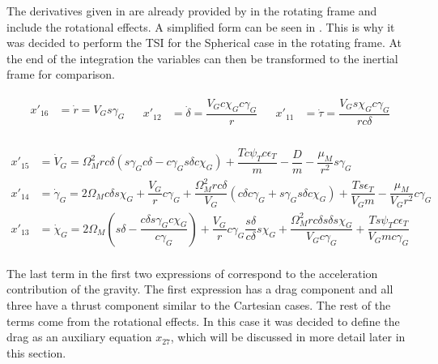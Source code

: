 \noindent
The derivatives given in  are already provided by \cite{mooij1994motion} in the rotating frame and include the rotational effects. A simplified form can be seen in . This is why it was decided to perform the \ac{TSI} for the Spherical case in the rotating frame. At the end of the integration the variables can then be transformed to the inertial frame for comparison.

\begin{align} \label{eq:kinEqSp}
\begin{split}
x'_{16} &= \dot{r} = V_{G} s \gamma_{G} \\
\end{split}
&
\begin{split}
x'_{12} &= \dot{\delta} = \dfrac{V_{G} c \chi_{G} c \gamma_{G}}{r} \\
\end{split}
&
\begin{split}
x'_{11} &= \dot{\tau} = \dfrac{V_{G} s \chi_{G} c \gamma_{G}}{r c \delta} \\
\end{split}
\end{align}


\begin{equation} \label{eq:dynEqSp}
\begin{split}
x'_{15} &= \dot{V}_{G} =  \Omega_{M}^{2} r c\delta \left(s\gamma_{G}c\delta-c\gamma_{G}s\delta c\chi_{G}\right)+\dfrac{Tc\psi_{T}c\epsilon_{T}}{m}-\dfrac{D}{m}-\dfrac{\mu_{M}}{r^{2}}s\gamma_{G} \\
x'_{14} &= \dot{\gamma}_{G} = 2\Omega_{M}c\delta s\chi_{G} + \dfrac{V_{G}}{r}c\gamma_{G}+\dfrac{\Omega_{M}^{2}r c\delta}{V_{G}}\left(c\delta c\gamma_{G}+s\gamma_{G} s\delta c\chi_{G}\right)+\dfrac{T s\epsilon_{T}}{V_{G}m}-\dfrac{\mu_{M}}{V_{G}r^{2}}c\gamma_{G} \\
x'_{13} &= \dot{\chi}_{G} = 2 \Omega_{M} \left(s\delta-\dfrac{c\delta s\gamma_{G} c\chi_{G}}{c \gamma_{G}}\right)+\dfrac{V_{G}}{r}c\gamma_{G}\dfrac{s\delta}{c \delta}s\chi_{G}+\dfrac{\Omega_{M}^{2}r c\delta s\delta s\chi_{G}}{V_{G}c\gamma_{G}}+\dfrac{T s\psi_{T}c\epsilon_{T}}{V_{G}m c\gamma_{G}} \\
\end{split}
\end{equation}

\noindent
The last term in the first two expressions of  correspond to the acceleration contribution of the gravity. The first expression has a drag component and all three have a thrust component similar to the Cartesian cases. The rest of the terms come from the rotational effects. In this case it was decided to define the drag as an auxiliary equation $x_{27}$, which will be discussed in more detail later in this section.

